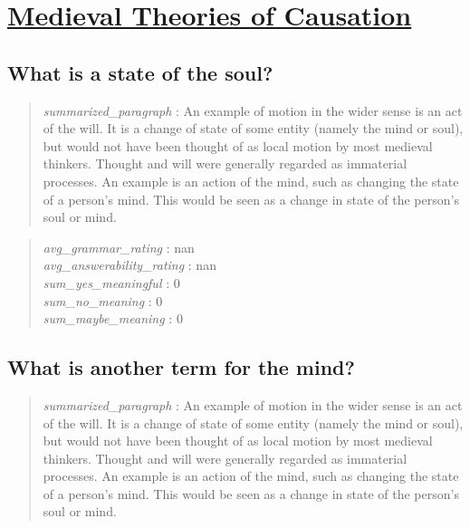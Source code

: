 \hypertarget{medieval-theories-of-causation}{%
\section{\texorpdfstring{\href{https://plato.stanford.edu/entries/causation-medieval/index.html}{Medieval
Theories of
Causation}}{Medieval Theories of Causation}}\label{medieval-theories-of-causation}}

\hypertarget{what-is-a-state-of-the-soul}{%
\subsection{What is a state of the
soul?}\label{what-is-a-state-of-the-soul}}

\begin{quote}
\emph{summarized\_paragraph} : An example of motion in the wider sense
is an act of the will. It is a change of state of some entity (namely
the mind or soul), but would not have been thought of as local motion by
most medieval thinkers. Thought and will were generally regarded as
immaterial processes. An example is an action of the mind, such as
changing the state of a person's mind. This would be seen as a change in
state of the person's soul or mind.
\end{quote}

\begin{quote}
\emph{avg\_grammar\_rating} : nan\\
\emph{avg\_answerability\_rating} : nan\\
\emph{sum\_yes\_meaningful} : 0\\
\emph{sum\_no\_meaning} : 0\\
\emph{sum\_maybe\_meaning} : 0
\end{quote}

\hypertarget{what-is-another-term-for-the-mind}{%
\subsection{What is another term for the
mind?}\label{what-is-another-term-for-the-mind}}

\begin{quote}
\emph{summarized\_paragraph} : An example of motion in the wider sense
is an act of the will. It is a change of state of some entity (namely
the mind or soul), but would not have been thought of as local motion by
most medieval thinkers. Thought and will were generally regarded as
immaterial processes. An example is an action of the mind, such as
changing the state of a person's mind. This would be seen as a change in
state of the person's soul or mind.
\end{quote}

